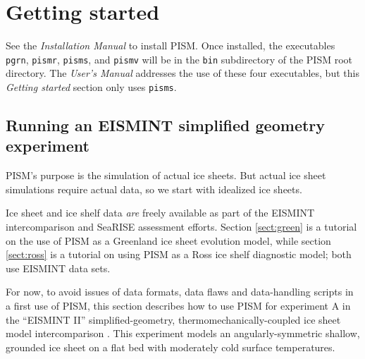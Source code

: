 \documentclass[11pt,final]{amsart}
\begin{document}
\vspace{1.0in}
\large
\begin{center}
\normalsize
\end{center}
\normalsize


\clearpage\newpage
\section{Getting started}\label{sect:start}

See the \emph{Installation Manual} to install PISM.  Once installed, the executables \verb|pgrn|, \verb|pismr|, \verb|pisms|, and \verb|pismv| will be in the \verb|bin| subdirectory of the PISM root directory.  The \emph{User's Manual} addresses the use of these four executables, but this \emph{Getting started} section only uses \verb|pisms|.
 
\subsection{Running an EISMINT simplified geometry experiment}  PISM's purpose is the simulation of actual ice sheets.  But actual ice sheet simulations require actual data, so we start with idealized ice sheets.

Ice sheet and ice shelf data \emph{are} freely available as part of the EISMINT intercomparison and SeaRISE assessment efforts.  Section \ref{sect:green} is a tutorial on the use of PISM as a Greenland ice sheet evolution model, while section \ref{sect:ross} is a tutorial on using PISM as a Ross ice shelf diagnostic model; both use EISMINT data sets.

For now, to avoid issues of data formats, data flaws and data-handling scripts in a first use of PISM, this section describes how to use PISM for experiment A in the ``EISMINT II'' simplified-geometry, thermomechanically-coupled ice sheet model intercomparison \cite{EISMINT00}.  This experiment models an angularly-symmetric shallow, grounded ice sheet on a flat bed with moderately cold surface temperatures.
\end{document}
